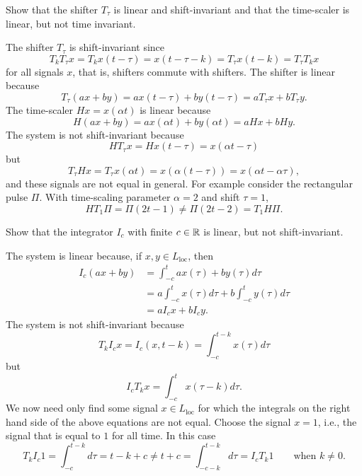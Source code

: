 \begin{excersizelist}
\begin{solution}
\end{solution}


\item Show that the shifter $T_\tau$ is linear and shift-invariant and that the time-scaler is linear, but not time invariant.
\begin{solution}
The shifter $T_\tau$ is shift-invariant since
\[
T_kT_\tau x  = T_kx(t - \tau) = x(t - \tau - k) = T_\tau x(t - k) = T_\tau T_k x 
\]
for all signals $x$, that is, shifters commute with shifters.  The shifter is linear because
\[
T_\tau(ax + by) = ax(t - \tau) + by(t - \tau) = a T_\tau x + b T_\tau y.
\]
The time-scaler $H x = x(\alpha t)$ is linear because
\[
H(ax + by) = ax(\alpha t) + by(\alpha t) = aHx + b Hy.
\]
The system is not shift-invariant because
\[
HT_\tau x = Hx(t-\tau) = x(\alpha t - \tau)
\]
but 
\[
T_\tau H x = T_\tau x(\alpha t) = x(\alpha(t - \tau)) = x( \alpha t - \alpha \tau ),
\]
and these signals are not equal in general.  For example consider the rectangular pulse $\Pi$.  With time-scaling parameter $\alpha = 2$ and shift $\tau = 1$,
\[
H T_1 \Pi = \Pi( 2 t - 1 ) \neq \Pi( 2t - 2 ) = T_1 H \Pi .
\]
\end{solution}


\item Show that the integrator $I_c$ with finite $c \in {\mathbb R}$ is linear, but not shift-invariant.
\begin{solution}
The system is linear because, if $x, y \in L_{\text{loc}}$, then
\begin{align*}
I_c(ax + by) &= \int_{-c}^t ax(\tau) + b y(\tau) d\tau \\
&= a\int_{-c}^t x(\tau) d\tau + b \int_{-c}^t y(\tau) d\tau \\
&= a I_c x  + b I_c y.
\end{align*}
The system is not shift-invariant because
\[
T_k I_c x = I_c(x,t-k) = \int_{-c}^{t-k} x(\tau) d\tau 
\]
but
\[
I_c T_k x = \int_{-c}^{t} x(\tau-k) d\tau.
\]
We now need only find some signal $x \in L_{\text{loc}}$ for which the integrals on the right hand side of the above equations are not equal.  Choose the signal $x = 1$, i.e., the signal that is equal to $1$ for all time.  In this case
\[
T_k I_c 1 = \int_{-c}^{t-k} d\tau =  t-k+c \neq t + c = \int_{-c-k}^{t-k} d\tau = I_c T_k 1 \qquad \text{when $k \neq 0$.}
\]
\end{solution}


\end{excersizelist}
